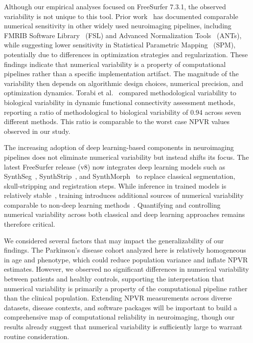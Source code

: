 Although our empirical analyses focused on FreeSurfer 7.3.1, the observed
variability is not unique to this tool. Prior
work~\cite{mirhakimi2025numerical} has documented comparable numerical
sensitivity in other widely used neuroimaging pipelines, including FMRIB
Software Library~\cite{jenkinson2012fsl} (FSL) and Advanced Normalization
Tools~\cite{avants2009advanced} (ANTs), while suggesting lower sensitivity in
Statistical Parametric Mapping~\cite{ashburner2009computational} (SPM),
potentially due to differences in optimization strategies and regularization.
These findings indicate that numerical variability is a property of
computational pipelines rather than a specific implementation artifact. The
magnitude of the variability then depends on algorithmic design choices,
numerical precision, and optimization dynamics. Torabi et
al.~\cite{torabi2024variability} compared methodological variability to
biological variability in dynamic functional connectivity assessment methods,
reporting a ratio of methodological to biological variability of 0.94 across
seven different methods. This ratio is comparable to the worst case NPVR values
observed in our study.

The increasing adoption of deep learning-based components in neuroimaging
pipelines does not eliminate numerical variability but instead shifts its
focus. The latest FreeSurfer release (v8) now integrates deep learning models
such as SynthSeg~\cite{billot2023synthseg},
SynthStrip~\cite{hoopes2022synthstrip}, and
SynthMorph~\cite{hoffmann2021synthmorph} to replace classical segmentation,
skull-stripping and registration steps. While inference in trained models is
relatively stable~\cite{pepe2023numerical}, training introduces additional
sources of numerical variability comparable to non-deep learning
methods~\cite{gonzalez2025uncertain}. Quantifying and
controlling numerical variability across both classical and deep learning
approaches remains therefore critical.

We considered several factors that may impact the generalizability of our
findings. The Parkinson's disease cohort analyzed here is relatively
homogeneous in age and phenotype, which could reduce population variance and
inflate NPVR estimates. However, we observed no significant differences in
numerical variability between patients and healthy controls, supporting the
interpretation that numerical variability is primarily a property of the
computational pipeline rather than the clinical population. Extending NPVR
measurements across diverse datasets, disease contexts, and software packages
will be important to build a comprehensive map of computational reliability in
neuroimaging, though our results already suggest that numerical variability is
sufficiently large to warrant routine consideration.

